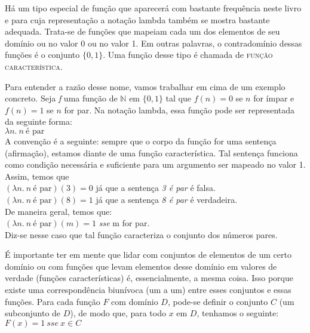 \n Há um tipo especial de função que aparecerá com bastante
frequência neste livro e para cuja representação a notação
lambda também se mostra bastante adequada. Trata-se de funções
que mapeiam cada um dos elementos de seu domínio ou no valor 0 ou
no valor 1. Em outras palavras, o contradomínio dessas
funções é o conjunto $\{0,1\}$. Uma função desse tipo é
chamada de \textsc{função característica}. 

Para entender a razão
desse nome, vamos trabalhar em cima de um exemplo concreto. Seja
\textit{f} uma função de $\mathbb{N}$ em $\{0,1\}$ tal que
$f(n)=0$ se $n$ for ímpar e $f(n)=1$ se $n$ for par. Na notação
lambda, essa função pode ser representada da seguinte forma:\\


\n $\lambda n.\ n\ \text{é par}$\\


\n A convenção é a seguinte: sempre que o corpo da função for uma sentença (afirmação), estamos diante de uma função característica. Tal sentença funciona como condição necessária e suficiente para um argumento ser mapeado no valor 1. Assim, temos que\\

\n $(\lambda n.\ n\ \text{é par})(3) = 0$ já que a sentença \textit{3 é par} é falsa.\\

\n $(\lambda n.\ n\ \text{é par})(8) = 1$ já que a sentença \textit{8 é par} é verdadeira.\\

\n De maneira geral, temos que:\\

\n $(\lambda n.\ n\ \text{é par})(m) = 1$ \textit{sse} m for par.\\
 
\n Diz-se nesse caso que tal função caracteriza o conjunto dos números pares.

É importante ter em mente que lidar com conjuntos de elementos de um certo domínio ou com funções que levam elementos desse domínio em valores de
verdade (funções características) é, essencialmente, a
mesma coisa. Isso porque existe uma correspondência biunívoca (um a um) entre esses conjuntos e essas funções. Para cada função $F$ com domínio $D$, pode-se definir o conjunto $C$ (um subconjunto de $D$),  de modo que, para todo $x$ em $D$, tenhamos o seguinte:\\

\n $F(x) = 1\ sse\ x \in C $\\

